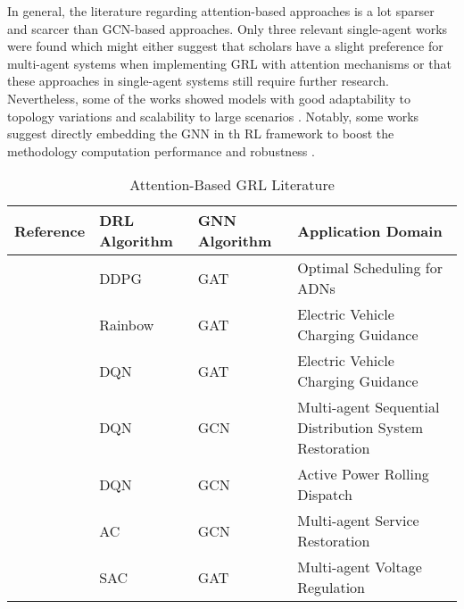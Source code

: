 In general, the literature regarding attention-based approaches is a lot sparser and scarcer than \ac{GCN}-based approaches. Only three relevant single-agent works were found \cite{xingRealtimeOptimalScheduling2023, xingBilevelGraphReinforcement2023, xuRealtimeFastCharging2022} which might either suggest that scholars have a slight preference for multi-agent systems when implementing \ac{GRL} with attention mechanisms or that these approaches in single-agent systems still require further research. Nevertheless, some of the works showed models with good adaptability to topology variations \cite{xingRealtimeOptimalScheduling2023, baiAdaptiveActivePower2023b, chenPhysicalassistedMultiagentGraph2023} and scalability to large scenarios \cite{zhaoLearningSequentialDistribution2022, xingRealtimeOptimalScheduling2023, baiAdaptiveActivePower2023b, chenPhysicalassistedMultiagentGraph2023}. Notably, some works suggest directly embedding the \ac{GNN} in th \ac{RL} framework to boost the methodology computation performance and robustness  \cite{xingRealtimeOptimalScheduling2023, xingRealtimeOptimalScheduling2023}.


\begin{table}[H] 
	\centering
	\caption{Attention-Based \acs{GRL} Literature}
	\begin{tabular}{|P{2cm}|P{2cm}|P{2cm}|p{5cm}|  }
		\hline
		\textbf{Reference} & \textbf{DRL Algorithm} & \textbf{GNN Algorithm} & \textbf{Application Domain} \\
		\hline
		\cite{xingRealtimeOptimalScheduling2023} & DDPG & GAT & Optimal Scheduling for ADNs  \\ \hline
		\cite{xingBilevelGraphReinforcement2023} & Rainbow & GAT  & Electric Vehicle Charging Guidance \\ \hline
		\cite{xuRealtimeFastCharging2022} & DQN & GAT & Electric Vehicle Charging Guidance \\ \hline 
		\hline
		\cite{zhaoLearningSequentialDistribution2022} & DQN & GCN & Multi-agent Sequential Distribution System Restoration \\ \hline
		\cite{baiAdaptiveActivePower2023b} & DQN & GCN & Active Power Rolling Dispatch \\ \hline
		\cite{fanAttentionBasedMultiAgentGraph2023} & AC & GCN & Multi-agent Service Restoration \\ \hline
		\cite{chenPhysicalassistedMultiagentGraph2023}  & SAC & GAT  & Multi-agent Voltage Regulation \\ \hline 
	\end{tabular}
	\label{tab:gat-lit}
\end{table}


